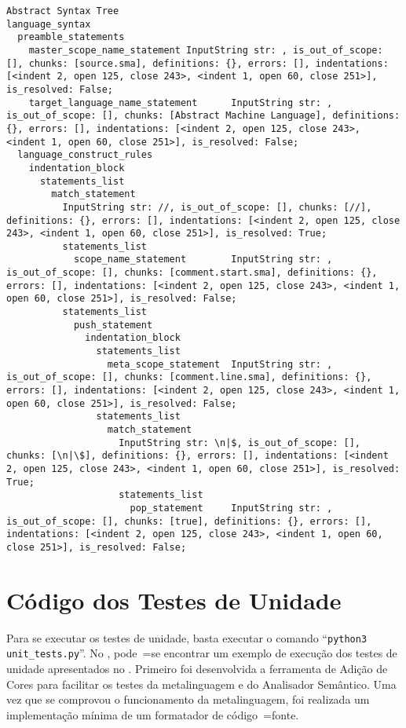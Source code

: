 \begin{code}
\begin{verbatim}
Abstract Syntax Tree
language_syntax
  preamble_statements
    master_scope_name_statement InputString str: , is_out_of_scope: [], chunks: [source.sma], definitions: {}, errors: [], indentations: [<indent 2, open 125, close 243>, <indent 1, open 60, close 251>], is_resolved: False;
    target_language_name_statement      InputString str: , is_out_of_scope: [], chunks: [Abstract Machine Language], definitions: {}, errors: [], indentations: [<indent 2, open 125, close 243>, <indent 1, open 60, close 251>], is_resolved: False;
  language_construct_rules
    indentation_block
      statements_list
        match_statement
          InputString str: //, is_out_of_scope: [], chunks: [//], definitions: {}, errors: [], indentations: [<indent 2, open 125, close 243>, <indent 1, open 60, close 251>], is_resolved: True;
          statements_list
            scope_name_statement        InputString str: , is_out_of_scope: [], chunks: [comment.start.sma], definitions: {}, errors: [], indentations: [<indent 2, open 125, close 243>, <indent 1, open 60, close 251>], is_resolved: False;
          statements_list
            push_statement
              indentation_block
                statements_list
                  meta_scope_statement  InputString str: , is_out_of_scope: [], chunks: [comment.line.sma], definitions: {}, errors: [], indentations: [<indent 2, open 125, close 243>, <indent 1, open 60, close 251>], is_resolved: False;
                statements_list
                  match_statement
                    InputString str: \n|$, is_out_of_scope: [], chunks: [\n|\$], definitions: {}, errors: [], indentations: [<indent 2, open 125, close 243>, <indent 1, open 60, close 251>], is_resolved: True;
                    statements_list
                      pop_statement     InputString str: , is_out_of_scope: [], chunks: [true], definitions: {}, errors: [], indentations: [<indent 2, open 125, close 243>, <indent 1, open 60, close 251>], is_resolved: False;
\end{verbatim}
\end{code}


\chapter{Código dos Testes de Unidade}

Para se executar os testes de unidade,
basta executar o comando ``\texttt{python3 unit_tests.py}''.
No ,
pode~=se encontrar um exemplo de execução dos testes de unidade apresentados no .
Primeiro foi desenvolvida a ferramenta de Adição de Cores para facilitar os testes da metalinguagem e
do Analisador Semântico.
Uma vez que se comprovou o funcionamento da metalinguagem,
foi realizada um implementação mínima de um formatador de código~=fonte.

